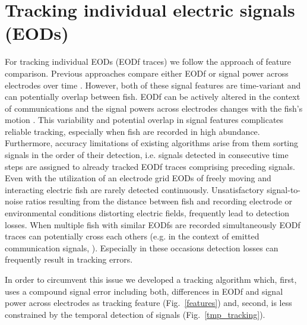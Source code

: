 \documentclass[11pt,pdftex]{article}
\newcommand{\fref}[1]{\textup{\ref{#1}}}
\newcommand{\fig}{Fig.}
\newcommand{\figref}[1]{\fig~\fref{#1}}
\begin{document}
\section{Tracking individual electric signals (EODs)}

For tracking individual EODs (EODf traces) we follow the approach of feature comparison. Previous approaches compare either EODf or signal power across electrodes over time \citep{Madhav2018, Henninger2020}. However, both of these signal features are time-variant and can potentially overlap between fish. EODf can be actively altered in the context of communications \citep{Smith2013} and the signal powers across electrodes changes with the fish's motion \citep{Madhav2018}. This variability and potential overlap in signal features complicates reliable tracking, especially when fish are recorded in high abundance. Furthermore, accuracy limitations of existing algorithms arise from them sorting signals in the order of their detection, i.e. signals detected in consecutive time steps are assigned to already tracked EODf traces comprising preceding signals. Even with the utilization of an electrode grid EODs of freely moving and interacting electric fish are rarely detected continuously. Unsatisfactory signal-to-noise ratios resulting from the distance between fish and recording electrode or environmental conditions distorting electric fields, frequently lead to detection losses. When multiple fish with similar EODfs are recorded simultaneously EODf traces can potentially cross each others (e.g. in the context of emitted communication signals, \citealp{Smith2013}). Especially in these occasions detection losses can frequently result in tracking errors. 

In order to circumvent this issue we developed a tracking algorithm which, first, uses a compound signal error including both, differences in EODf and signal power across electrodes as tracking feature (\figref{features}) and, second, is less constrained by the temporal detection of signals (\figref{tmp_tracking}). 
\end{document}
